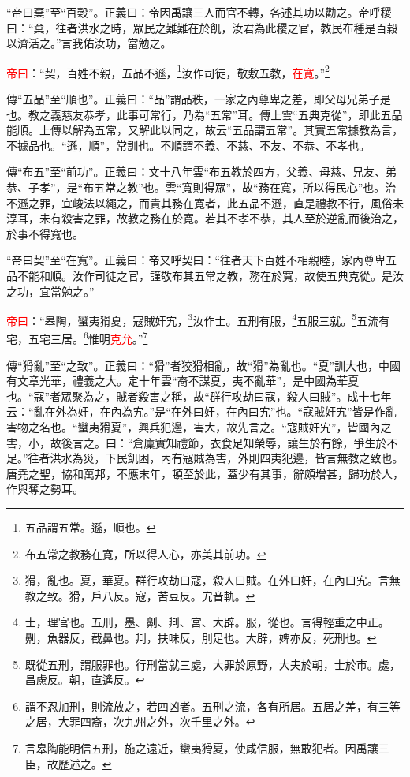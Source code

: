 {\noindent\shu{}\fzkt “帝曰棄”至“百穀”。正義曰：帝因禹讓三人而官不轉，各述其功以勸之。帝呼稷曰：“棄，往者洪水之時，眾民之難難在於飢，汝君為此稷之官，教民布種是百穀以濟活之。”言我佑汝功，當勉之。 \par}

\textcolor{red}{帝曰}：“契，百姓不親，五品不遜，\footnote{五品謂五常。遜，順也。}汝作司徒，敬敷五教，\textcolor{red}{在寬}。”\footnote{布五常之教務在寬，所以得人心，亦美其前功。}

{\noindent\zhuan{}\fzbyks 傳“五品”至“順也”。正義曰：“品”謂品秩，一家之內尊卑之差，即父母兄弟子是也。教之義慈友恭孝，此事可常行，乃為“五常”耳。傳上雲“五典克從”，即此五品能順。上傳以解為五常，又解此以同之，故云“五品謂五常”。其實五常據教為言，不據品也。“遜，順”，常訓也。不順謂不義、不慈、不友、不恭、不孝也。 \par}

{\noindent\zhuan{}\fzbyks 傳“布五”至“前功”。正義曰：文十八年雲“布五教於四方，父義、母慈、兄友、弟恭、子孝”，是“布五常之教”也。雲“寬則得眾”，故“務在寬，所以得民心”也。治不遜之罪，宜峻法以繩之，而貴其務在寬者，此五品不遜，直是禮教不行，風俗未淳耳，未有殺害之罪，故教之務在於寬。若其不孝不恭，其人至於逆亂而後治之，於事不得寬也。 \par}

{\noindent\shu{}\fzkt “帝曰契”至“在寬”。正義曰：帝又呼契曰：“往者天下百姓不相親睦，家內尊卑五品不能和順。汝作司徒之官，謹敬布其五常之教，務在於寬，故使五典克從。是汝之功，宜當勉之。” \par}

\textcolor{red}{帝曰}：“皋陶，蠻夷猾夏，寇賊奸宄，\footnote{猾，亂也。夏，華夏。群行攻劫曰寇，殺人曰賊。在外曰奸，在內曰宄。言無教之致。猾，戶八反。寇，苦豆反。宄音軌。}汝作士。五刑有服，\footnote{士，理官也。五刑，墨、劓、剕、宮、大辟。服，從也。言得輕重之中正。劓，魚器反，截鼻也。剕，扶味反，刖足也。大辟，婢亦反，死刑也。}五服三就。\footnote{既從五刑，謂服罪也。行刑當就三處，大罪於原野，大夫於朝，士於市。處，昌慮反。朝，直遙反。}五流有宅，五宅三居。\footnote{謂不忍加刑，則流放之，若四凶者。五刑之流，各有所居。五居之差，有三等之居，大罪四裔，次九州之外，次千里之外。}惟明\textcolor{red}{克允}。”\footnote{言皋陶能明信五刑，施之遠近，蠻夷猾夏，使咸信服，無敢犯者。因禹讓三臣，故歷述之。}

{\noindent\zhuan{}\fzbyks 傳“猾亂”至“之致”。正義曰：“猾”者狡猾相亂，故“猾”為亂也。“夏”訓大也，中國有文章光華，禮義之大。定十年雲“裔不謀夏，夷不亂華”，是中國為華夏也。“寇”者眾聚為之，賊者殺害之稱，故“群行攻劫曰寇，殺人曰賊”。成十七年云：“亂在外為奸，在內為宄。”是“在外曰奸，在內曰宄”也。“寇賊奸宄”皆是作亂害物之名也。“蠻夷猾夏”，興兵犯邊，害大，故先言之。“寇賊奸宄”，皆國內之害，小，故後言之。曰：“倉廩實知禮節，衣食足知榮辱，讓生於有餘，爭生於不足。”往者洪水為災，下民飢困，內有寇賊為害，外則四夷犯邊，皆言無教之致也。唐堯之聖，協和萬邦，不應末年，頓至於此，蓋少有其事，辭頗增甚，歸功於人，作與奪之勢耳。 \par}

